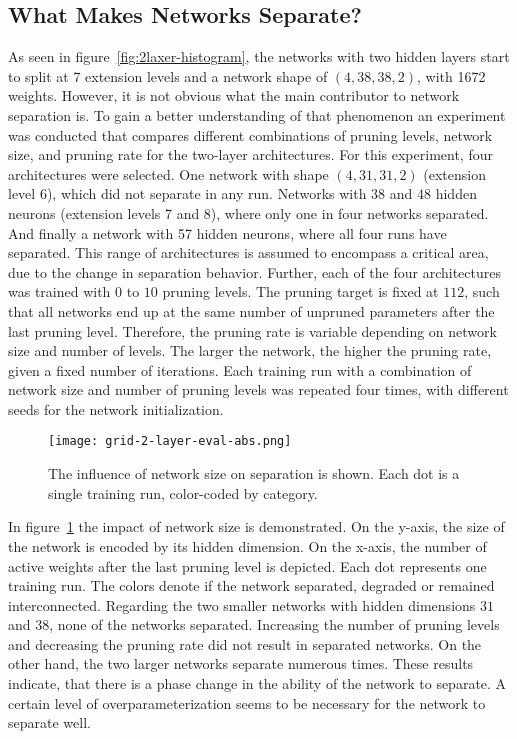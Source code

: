 \subsection{What Makes Networks Separate?}
As seen in figure~\ref{fig:2laxer-histogram}, the networks with two hidden layers start to split at 7 extension levels and a network shape of $(4,38,38,2)$, with 1672 weights.
However, it is not obvious what the main contributor to network separation is.
To gain a better understanding of that phenomenon an experiment was conducted that compares different combinations of pruning levels, network size, and pruning rate for the two-layer architectures.
For this experiment, four architectures were selected.
One network with shape $(4,31,31,2)$ (extension level 6), which did not separate in any run.
Networks with $38$ and $48$ hidden neurons (extension levels 7 and 8), where only one in four networks separated.
And finally a network with 57 hidden neurons, where all four runs have separated.
This range of architectures is assumed to encompass a critical area, due to the change in separation behavior.
Further, each of the four architectures was trained with $0$ to $10$ pruning levels.
The pruning target is fixed at $112$, such that all networks end up at the same number of unpruned parameters after the last pruning level.
Therefore, the pruning rate is variable depending on network size and number of levels.
The larger the network, the higher the pruning rate, given a fixed number of iterations.
Each training run with a combination of network size and number of pruning levels was repeated four times, with different seeds for the network initialization.

\begin{figure}[ht] %
    \centering
    \texttt{[image: grid-2-layer-eval-abs.png]}
    \caption[Influence of network size on separation]{
        The influence of network size on separation is shown.
        Each dot is a single training run, color-coded by category.
        }\label{fig:grid-1}
\end{figure}

In figure~\ref{fig:grid-1} the impact of network size is demonstrated.
On the y-axis, the size of the network is encoded by its hidden dimension.
On the x-axis, the number of active weights after the last pruning level is depicted.
Each dot represents one training run.
The colors denote if the network separated, degraded or remained interconnected.
Regarding the two smaller networks with hidden dimensions $31$ and $38$, none of the networks separated. 
Increasing the number of pruning levels and decreasing the pruning rate did not result in separated networks.
On the other hand, the two larger networks separate numerous times.
These results indicate, that there is a phase change in the ability of the network to separate.
A certain level of overparameterization seems to be necessary for the network to separate well.

